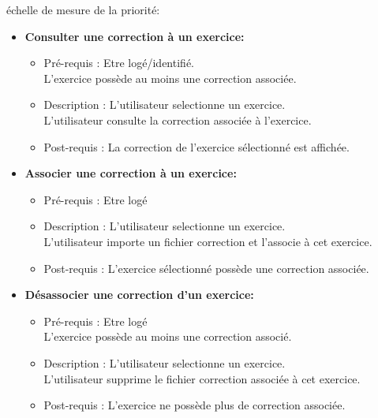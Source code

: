 \begin{center}
{\'e}chelle de mesure de la priorit{\'e}:

\end{center}


\begin{itemize}
\item {\bf Consulter une correction {\`a} un exercice:}
	\begin{itemize}
	\item Pr{\'e}-requis : Etre log{\'e}/identifi{\'e}.\\
	L'exercice poss{\`e}de au moins une correction associ{\'e}e.
	\item Description :  L'utilisateur selectionne un exercice.\\
	L'utilisateur consulte la correction associ{\'e}e {\`a} l'exercice.
	\item Post-requis : La correction de l'exercice s{\'e}lectionn{\'e} est affich{\'e}e.
	\end{itemize}

\item {\bf Associer une correction {\`a} un exercice:}
	\begin{itemize}
	\item Pr{\'e}-requis : Etre log{\'e}
	\item Description :  L'utilisateur selectionne un exercice.\\
	L'utilisateur importe un fichier correction et l'associe {\`a} cet exercice.
	\item Post-requis : L'exercice s{\'e}lectionn{\'e} poss{\`e}de une correction associ{\'e}e.
	\end{itemize}

\item {\bf D{\'e}sassocier une correction d'un exercice:}
	\begin{itemize}
	\item Pr{\'e}-requis : Etre log{\'e}\\
	L'exercice poss{\`e}de au moins une correction associ{\'e}.
	\item Description : L'utilisateur selectionne un exercice.\\
	L'utilisateur supprime le fichier correction associ{\'e}e {\`a} cet exercice.
	\item Post-requis : L'exercice ne poss{\`e}de plus de correction associ{\'e}e.\\
	\end{itemize}
			
\end{itemize}